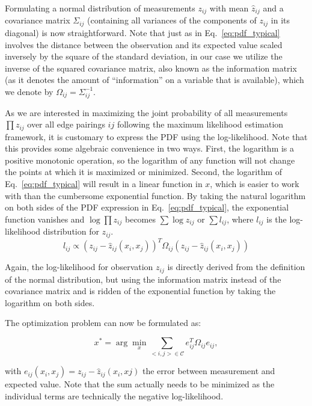 Formulating a normal distribution of measurements $ z_{ij}$ with mean $ \hat{z}_{ij}$ and a covariance matrix $ \Sigma_{ij}$ (containing all variances of the components of $ z_{ij}$ in its diagonal) is now straightforward. Note that just as in Eq.\ \eqref{eq:pdf_typical} involves the distance between the observation and its expected value scaled inversely by the square of the standard deviation, in our case we utilize the inverse of the squared covariance matrix, also known as the information matrix (as it denotes the amount of ``information'' on a variable that is available), which we denote by $ \Omega_{ij}=\Sigma_{ij}^{-1}$.

As we are interested in maximizing the joint probability of all measurements $ \prod{z_{ij}}$ over all edge pairings $ ij$ following the maximum likelihood estimation framework, it is customary to express the PDF using the log-likelihood. Note that this provides some algebraic convenience in two ways. First, the logarithm is a positive monotonic operation, so the logarithm of any function will not change the points at which it is maximized or minimized. Second, the logarithm of Eq.\ \eqref{eq:pdf_typical} will result in a linear function in $x$, which is easier to work with than the cumbersome exponential function. By taking the natural logarithm on both sides of the PDF expression in Eq.\ \eqref{eq:pdf_typical}, the exponential function vanishes and $\log \prod{z_{ij}}$ becomes $ \sum{\log z_{ij}}$ or $ \sum{l_{ij}}$, where $ l_{ij}$ is the log-likelihood distribution for $ z_{ij}$.
\begin{equation}
l_{ij} \propto (z_{ij}-\hat{z}_{ij}(x_i,x_j))^T\Omega_{ij}(z_{ij}-\hat{z}_{ij}(x_i,x_j))
\end{equation}

Again, the log-likelihood for observation $ z_{ij}$ is directly derived from the definition of the normal distribution, but using the information matrix instead of the covariance matrix and is ridden of the exponential function by taking the logarithm on both sides.

The optimization problem can now be formulated as:

\begin{equation}\label{eq:slamEM}
x^* = \arg \min_{x}\sum_{<i,j>\in \mathcal{C}}e_{ij}^T\Omega_{ij}e_{ij},
\end{equation}

\noindent with $ e_{ij}(x_i,x_j)=z_{ij}-\hat{z}_{ij}(x_i,xj)$ the error between measurement and expected value. Note that the sum actually needs to be minimized as the individual terms are technically the negative log-likelihood.

